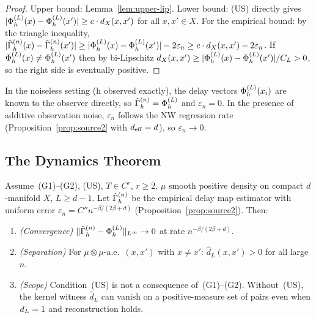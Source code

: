 \begin{proof}
Upper bound: Lemma~\ref{lem:upper-lip}.
Lower bound: (US) directly gives $|\Phi_h^{(L)}(x) - \Phi_h^{(L)}(x')| \geq c \cdot d_X(x,x')$
for all $x, x' \in X$.
For the empirical bound: by the triangle inequality,
$|\hat{\Gamma}_h^{(n)}(x) - \hat{\Gamma}_h^{(n)}(x')| \geq |\Phi_h^{(L)}(x) - \Phi_h^{(L)}(x')| - 2\varepsilon_n
\geq c \cdot d_X(x,x') - 2\varepsilon_n$.
If $\Phi_h^{(L)}(x) \neq \Phi_h^{(L)}(x')$ then by bi-Lipschitz $d_X(x,x') \geq |\Phi_h^{(L)}(x)-\Phi_h^{(L)}(x')|/C_L > 0$,
so the right side is eventually positive.
\end{proof}

\begin{remark}
In the noiseless setting (h observed exactly), the delay vectors
$\Phi_h^{(L)}(x_i)$ are known to the observer directly, so $\hat{\Gamma}_h^{(n)} = \Phi_h^{(L)}$
and $\varepsilon_n = 0$.
In the presence of additive observation noise, $\varepsilon_n$ follows
the NW regression rate (Proposition~\ref{prop:source2} with $d_{\mathrm{eff}} = d$),
so $\varepsilon_n \to 0$.
\end{remark}

\subsection{The Dynamics Theorem}

\begin{theorem}
\label{thm:dynamics}
Assume~(G1)--(G2), (US), $T \in C^r$, $r \geq 2$, $\mu$ smooth positive
density on compact $d$-manifold $X$, $L \geq d-1$.
Let $\hat{\Gamma}_h^{(n)}$ be the empirical delay map estimator with uniform error
$\varepsilon_n = C'' n^{-\beta/(2\beta+d)}$ (Proposition~\ref{prop:source2}).
Then:
\begin{enumerate}[label=(\alph*)]
  \item \emph{(Convergence)} $\|\hat{\Gamma}_h^{(n)} - \Phi_h^{(L)}\|_{L^{\infty}} \to 0$ at
    rate $n^{-\beta/(2\beta+d)}$.
  \item \emph{(Separation)} For $\mu \otimes \mu$-a.e.\ $(x,x')$ with
    $x \neq x'$: $\widehat{d}_L(x,x') > 0$ for all large $n$.
  \item \emph{(Scope)} Condition~(US) is not a consequence of~(G1)--(G2).
    Without~(US), the kernel witness $\widehat{d}_L$ can vanish on a positive-measure
    set of pairs even when $d_{L} = 1$ and reconstruction holds.
\end{enumerate}
\end{theorem}

